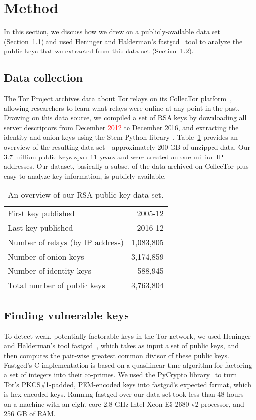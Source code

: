 \section{Method}
\label{sec:method}
In this section, we discuss how we drew on a publicly-available data set
(Section~\ref{sec:data-collection}) and used Heninger and Halderman's
fastgcd~\cite{fastgcd} tool to analyze the public keys that we extracted from
this data set (Section~\ref{sec:vulnerable-keys}).

\subsection{Data collection}
\label{sec:data-collection}
The Tor Project archives data about Tor relays on its CollecTor
platform~\cite{collector}, allowing researchers to learn what relays were online
at any point in the past.  Drawing on this data source, we compiled a set of RSA
keys by downloading all server descriptors from December \textcolor{red}{2012} to December 2016,
and extracting the identity and onion keys using the Stem Python
library~\cite{stem}.  Table~\ref{tab:dataset} provides an overview of the
resulting data set---approximately 200 GB of unzipped data.  Our 3.7 million
public keys span 11 years and were created on one million IP addresses.
Our dataset, basically a subset of the data archived on CollecTor plus
easy-to-analyze key information, is publicly available.

\begin{table}[t]
	\centering
	\begin{tabular}{l r}
	\toprule
	First key published & 2005-12 \\
	Last key published & 2016-12 \\
	Number of relays (by IP address) & 1,083,805 \\
	\midrule
	Number of onion keys & 3,174,859 \\
	Number of identity keys & 588,945 \\
	\midrule
	Total number of public keys & 3,763,804 \\
	\bottomrule
	\end{tabular}
	\caption{An overview of our RSA public key data set.}
	\label{tab:dataset}
\end{table}

\subsection{Finding vulnerable keys}
\label{sec:vulnerable-keys}
To detect weak, potentially factorable keys in the Tor network, we used Heninger
and Halderman's tool fastgcd~\cite{fastgcd}, which takes as input a set of
public keys, and then computes the pair-wise greatest common divisor of these
public keys.  Fastgcd's C implementation is based on a quasilinear-time
algorithm for factoring a set of integers into their co-primes.  We used the
PyCrypto library~\cite{pycrypto} to turn Tor's PKCS\#1-padded, PEM-encoded keys
into fastgcd's expected format, which is hex-encoded keys.  Running fastgcd over
our data set took less than 48 hours on a machine with an eight-core 2.8 GHz
Intel Xeon E5 2680 v2 processor, and 256 GB of RAM.
